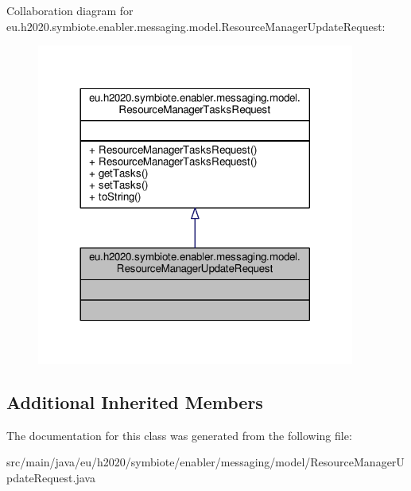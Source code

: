 Collaboration diagram for eu.\+h2020.\+symbiote.\+enabler.\+messaging.\+model.\+Resource\+Manager\+Update\+Request\+:
\nopagebreak
\begin{figure}[H]
\begin{center}
\leavevmode
\includegraphics[width=296pt]{classeu_1_1h2020_1_1symbiote_1_1enabler_1_1messaging_1_1model_1_1ResourceManagerUpdateRequest__coll__graph}
\end{center}
\end{figure}
\subsection*{Additional Inherited Members}


The documentation for this class was generated from the following file\+:\begin{DoxyCompactItemize}
\item 
src/main/java/eu/h2020/symbiote/enabler/messaging/model/Resource\+Manager\+Update\+Request.\+java\end{DoxyCompactItemize}
